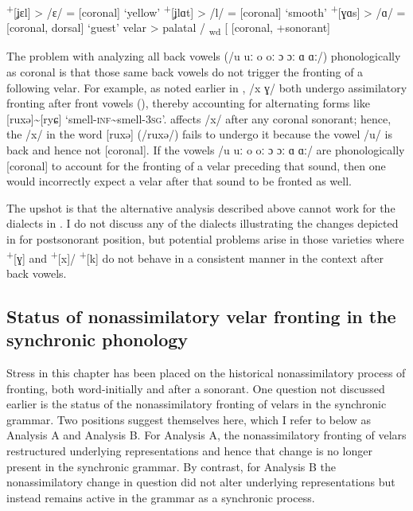 \ea%
\label{ex:14:44}
\ea\label{ex:14:44a}\textsuperscript{+}[ʝɛl]  \tab > \tab [ʝɛl] \tab /ɛ/ \tab = [coronal]         \tab ‘yellow’
\ex\label{ex:14:44b}\textsuperscript{+}[ʝlɑt] \tab > \tab [jlɑt]\tab /l/ \tab = [coronal]         \tab ‘smooth’
\ex\label{ex:14:44c}\textsuperscript{+}[ɣɑs]  \tab > \tab [ʝɑs] \tab /ɑ/ \tab = [coronal, dorsal] \tab ‘guest’
\z 
\ex%
\label{ex:14:45}
      velar > palatal / \textsubscript{wd} [ {\longrule}{\longrule} [coronal, +sonorant]
\z 


The problem with analyzing all back vowels (/u uː o oː ɔ ɔː ɑ ɑː/) phonologically as coronal is that those same back vowels do not trigger the fronting of a following velar. For example, as noted earlier in ,  /x ɣ/ both undergo assimilatory fronting after front vowels (), thereby accounting for alternating forms like [ruxǝ]{\textasciitilde}[ryɕ] ‘smell-\textsc{inf}{\textasciitilde}smell-\textsc{3sg}’.  affects /x/ after any coronal sonorant; hence, the /x/ in the word [ruxǝ] (/ruxǝ/) fails to undergo it because the vowel /u/ is back and hence not [coronal]. If the vowels /u uː o oː ɔ ɔː ɑ ɑː/ are phonologically [coronal] to account for the fronting of a velar preceding that sound, then one would incorrectly expect a velar after that sound to be fronted as well.

The upshot is that the alternative analysis described above cannot work for the dialects in . I do not discuss any of the dialects illustrating the changes depicted in  for postsonorant position, but potential problems arise in those varieties where \textsuperscript{+}[ɣ] and \textsuperscript{+}[x]/\textsuperscript{ +}[k] do not behave in a consistent manner in the context after back vowels.

\subsection{Status of nonassimilatory velar fronting in the synchronic phonology}\label{sec:14.6.2}\largerpage

Stress in this chapter has been placed on the historical nonassimilatory process of fronting, both word-initially and after a sonorant. One question not discussed earlier is the status of the nonassimilatory fronting of velars in the synchronic grammar. Two positions suggest themselves here, which I refer to below as Analysis A and Analysis B. For Analysis A, the nonassimilatory fronting of velars restructured underlying representations and hence that change is no longer present in the synchronic grammar. By contrast, for Analysis B the nonassimilatory change in question did not alter underlying representations but instead remains active in the grammar as a synchronic process.

